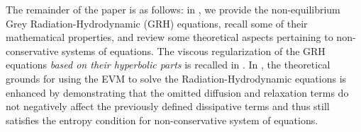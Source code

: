 \documentclass[times,doublespace]{fldauth}%
\begin{document}
The remainder of the paper is as follows: in , we provide
the non-equilibrium Grey Radiation-Hydrodynamic (GRH) equations, recall some of their mathematical properties, 
and review some theoretical aspects pertaining to non-conservative systems of equations. 
The viscous regularization of the GRH equations {\it based on their hyperbolic parts} is recalled in .
In , the theoretical grounds for using the EVM to solve the 
Radiation-Hydrodynamic equations is enhanced by demonstrating that the omitted diffusion
and relaxation terms do not negatively affect the previously defined dissipative terms and thus still satisfies the 
entropy condition for non-conservative system of equations. 
%
\end{document}
